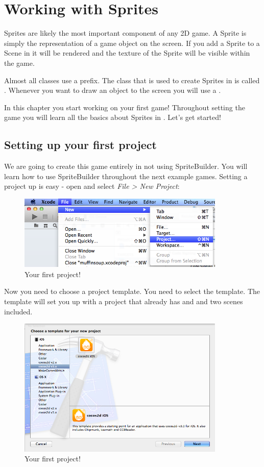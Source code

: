 \chapter{Working with Sprites}
Sprites are likely the most important component of any 2D game. A Sprite is
simply the representation of a game object on the screen. If you add a Sprite to
a Scene in \cocos{} it will be rendered and the texture of the Sprite will be
visible within the game. 

Almost all \cocos{} classes use a  prefix. The class that is used
to create Sprites in \cocos{} is called . Whenever you want
to draw an object to the screen you will use a .

In this chapter you start working on your first game! Throughout setting the
game you will learn all the basics about Sprites in \cocos{}. Let's get started!

\section{Setting up your first \cocos{} project}
We are going to create this game entirely in \xcode{} not using SpriteBuilder. You
will learn how to use SpriteBuilder throughout the next example games. 
Setting a \cocos{} project up is easy - open \xcode{} and select \textit{File >
New Project}:

\begin{figure}[H]
		\centering
		\includegraphics[width=280pt]{images/sprites/xcode_new_project.png}     
		\caption{Your first \cocos{} project!}
\end{figure}

Now you need to choose a project template. You need to select the \cocos{}
template. The \cocos{} template will set you up with a project that already has
\cocos{} and and two scenes included.

\begin{figure}[H]
		\centering
		\includegraphics[width=280pt]{images/sprites/new_cocos_project.png}     
		\caption{Your first \cocos{} project!}
\end{figure}

